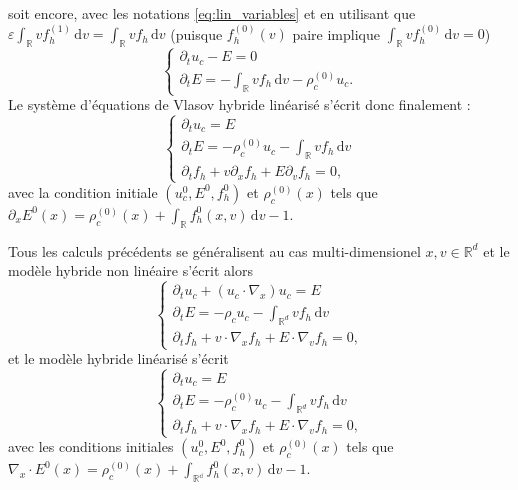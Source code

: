 soit encore, avec les notations \eqref{eq:lin_variables} et en utilisant que $\varepsilon \int_{\mathbb{R}} v f_h^{(1)}  \,\mathrm{d}v = \int_{\mathbb{R}} v f_h  \,\mathrm{d}v$ (puisque $f^{(0)}_h(v)$ paire implique  $\int_{\mathbb{R}} v f_h^{(0)}  \,\mathrm{d}v  =0$) %
$$
  \begin{cases}
    \partial_t u_c -  E = 0 \\
    \partial_t E = -\int_{\mathbb{R}} vf_h\,\mathrm{d}v - \rho_c^{(0)}u_c. 
  \end{cases}
$$
Le système d'équations de Vlasov hybride linéarisé s'écrit donc finalement :
\begin{equation}
  \begin{cases}
    \partial_t u_c = E \\
    \partial_t E = -\rho_c^{(0)}u_c -\int_{\mathbb{R}} vf_h\,\mathrm{d}v \\
    \partial_t f_h + v\partial_x f_h + E \partial_v f_h = 0,
  \end{cases}
\label{eq:vahl}
\end{equation}
avec la condition initiale $(u_c^{0}, E^{0}, f_h^{0})$ et $\rho_c^{(0)}(x)$ tels que $\partial_x E^{0}(x) = \rho_c^{(0)}(x) + \int_{\mathbb{R}} f_h^{0}(x, v) \,\mathrm{d}v -1$. 

\begin{remark}
  Tous les calculs précédents se généralisent au cas multi-dimensionel $x, v\in\mathbb{R}^d$ et le modèle hybride non linéaire s'écrit alors 
  \begin{equation}
    \begin{cases}
     \partial_t u_c  + (u_c \cdot \nabla_x ) u_c = E \\
      \partial_t E = -\rho_cu_c -\int_{\mathbb{R}^d} vf_h\,\mathrm{d}v \\
      \partial_t f_h + v \cdot \nabla_x f_h + E \cdot \nabla_v f_h = 0,
    \end{cases}
  \label{eq:vahnl_multid}
  \end{equation}
  et le modèle hybride linéarisé s'écrit 
  \begin{equation}
    \begin{cases}
     \partial_t u_c = E \\
     \partial_t E = -\rho_c^{(0)}u_c -\int_{\mathbb{R}^d} vf_h\,\mathrm{d}v \\
      \partial_t f_h + v \cdot \nabla_x f_h + E \cdot \nabla_v f_h = 0,
   \end{cases}
  \label{eq:vahl_multid}
  \end{equation}
  avec les conditions initiales $(u^0_c, E^0, f^0_h)$ et $\rho_c^{(0)}(x)$ tels que $\nabla_x \cdot E^0(x) = \rho_c^{(0)}(x) + \int_{\mathbb{R^d}} f_h^0(x,v)\,\mathrm{d}v -1$. 
\end{remark}

